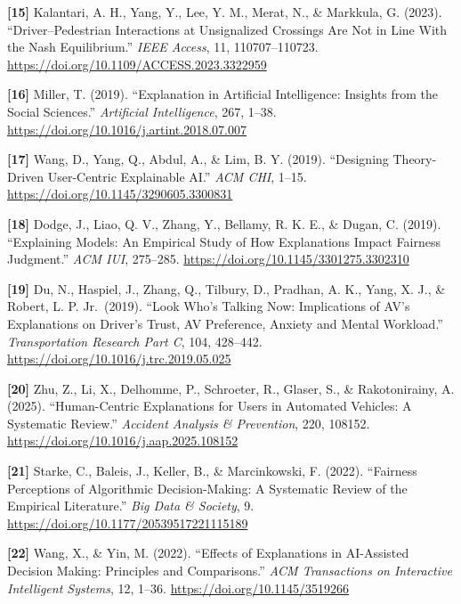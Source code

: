 \documentclass[
  english,
  11pt,
  a4paper,
]{article}
\begin{document}
\protect{}\label{source-15}{} \textbf{{[}15{]}} Kalantari,
A. H., Yang, Y., Lee, Y. M., Merat, N., \& Markkula, G. (2023).
``Driver--Pedestrian Interactions at Unsignalized Crossings Are Not in
Line With the Nash Equilibrium.'' \emph{IEEE Access}, 11,
110707--110723. \url{https://doi.org/10.1109/ACCESS.2023.3322959}

\protect{}\label{source-16}{} \textbf{{[}16{]}} Miller, T.
(2019). ``Explanation in Artificial Intelligence: Insights from the
Social Sciences.'' \emph{Artificial Intelligence}, 267, 1--38.
\url{https://doi.org/10.1016/j.artint.2018.07.007}

\protect{}\label{source-17}{} \textbf{{[}17{]}} Wang, D.,
Yang, Q., Abdul, A., \& Lim, B. Y. (2019). ``Designing Theory-Driven
User-Centric Explainable AI.'' \emph{ACM CHI}, 1--15.
\url{https://doi.org/10.1145/3290605.3300831}

\protect{}\label{source-18}{} \textbf{{[}18{]}} Dodge, J.,
Liao, Q. V., Zhang, Y., Bellamy, R. K. E., \& Dugan, C. (2019).
``Explaining Models: An Empirical Study of How Explanations Impact
Fairness Judgment.'' \emph{ACM IUI}, 275--285.
\url{https://doi.org/10.1145/3301275.3302310}

\protect{}\label{source-19}{} \textbf{{[}19{]}} Du, N.,
Haspiel, J., Zhang, Q., Tilbury, D., Pradhan, A. K., Yang, X. J., \&
Robert, L. P. Jr.~(2019). ``Look Who's Talking Now: Implications of AV's
Explanations on Driver's Trust, AV Preference, Anxiety and Mental
Workload.'' \emph{Transportation Research Part C}, 104, 428--442.
\url{https://doi.org/10.1016/j.trc.2019.05.025}

\protect{}\label{source-20}{} \textbf{{[}20{]}} Zhu, Z.,
Li, X., Delhomme, P., Schroeter, R., Glaser, S., \& Rakotonirainy, A.
(2025). ``Human-Centric Explanations for Users in Automated Vehicles: A
Systematic Review.'' \emph{Accident Analysis \& Prevention}, 220,
108152. \url{https://doi.org/10.1016/j.aap.2025.108152}

\protect{}\label{source-21}{} \textbf{{[}21{]}} Starke, C.,
Baleis, J., Keller, B., \& Marcinkowski, F. (2022). ``Fairness
Perceptions of Algorithmic Decision-Making: A Systematic Review of the
Empirical Literature.'' \emph{Big Data \& Society}, 9.
\url{https://doi.org/10.1177/20539517221115189}

\protect{}\label{source-22}{} \textbf{{[}22{]}} Wang, X.,
\& Yin, M. (2022). ``Effects of Explanations in AI-Assisted Decision
Making: Principles and Comparisons.'' \emph{ACM Transactions on
Interactive Intelligent Systems}, 12, 1--36.
\url{https://doi.org/10.1145/3519266}
\end{document}
